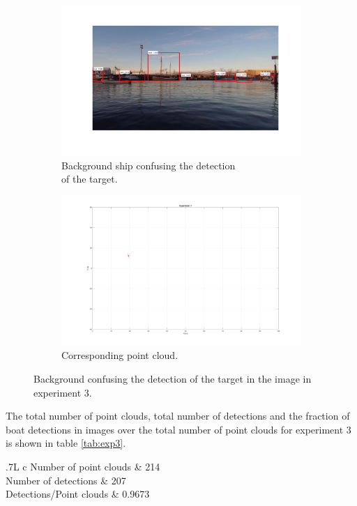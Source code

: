 \begin{figure}[H]
	\centering
	\begin{subfigure}[t]{.5\linewidth}
		\centering
		\includegraphics[width=\linewidth]{fig/ex3_miss.png}
		\caption{Background ship confusing the detection\\ of the target.}
		\label{fig:sub_ex3_issue}
	\end{subfigure}%
	\begin{subfigure}[t]{.5\linewidth}
		\centering
		\includegraphics[width=\linewidth]{fig/ex3_miss_pc.png}
		\caption{Corresponding point cloud.}
		\label{fig:sub_ex3_issue2}
	\end{subfigure}
	\caption{Background confusing the detection of the target in the image in experiment 3.}
	\label{fig:issues_ex3}
\end{figure}
The total number of point clouds, total number of detections and the fraction of boat detections in images over the total number of point clouds for experiment 3 is shown in table \ref{tab:exp3}.
\begin{table}[H]
	\centering
	\begin{tabularx}{.7\linewidth}{L c}
		\toprule
		Number of point clouds & 214\\
		\midrule
		Number of detections & 207\\
		\midrule
		Detections/Point clouds & 0.9673 \\
		\bottomrule
	\end{tabularx}
	\caption{Data from experiment 3.}
	\label{tab:exp3}
\end{table}
